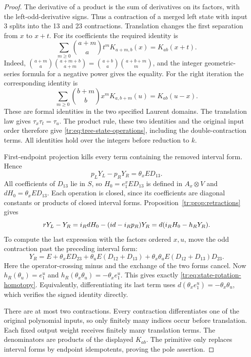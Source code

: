 \begin{proof}
The derivative of a product is the sum of derivatives on its factors,
with the left-odd-derivative signs.  Thus a contraction of a merged
left state with input 3 splits into the 13 and 23 contractions.
Translation changes the first separation from \(x\) to \(x+t\).
For its coefficients the required identity is
\[
 \sum_{m\ge0}\binom{a+m}{a}t^m K_{a+m,b}(x)
 =K_{ab}(x+t).
\]
Indeed,
\(\binom{a+m}{a}\binom{a+m+b}{a+m}
=\binom{a+b}{a}\binom{a+b+m}{m}\), and the integer
geometric-series formula for a negative power gives the equality.
For the right iteration the corresponding identity is
\[
 \sum_{m\ge0}\binom{b+m}{b}x^m K_{a,b+m}(u)
 =K_{ab}(u-x).
\]
These are formal identities in the two specified Laurent domains.
The translation law gives \(\tau_x\tau_t=\tau_u\).
The product rule, these two identities and the original input order
therefore give \eqref{tr:eq:tree-state-operations}, including the
double-contraction terms.  All identities hold over the integers
before reduction to \(k\).

First-endpoint projection kills every term containing the removed
interval form.  Hence
\[
 p_LY_L-p_RY_R=\theta_x ED_{13}.
\]
All coefficients of \(D_{13}\) lie in \(S\), so
\(H_0=e_1^x ED_{13}\) is defined in \(A_x\otimes V\)
and \(dH_0=\theta_x ED_{13}\).  Each operation is closed,
since its coefficients are diagonal constants or products of closed
interval forms.  Proposition~\ref{tr:prop:retractions} gives
\[
 rY_L-Y_R=i_RdH_0-(id-i_Rp_R)Y_R
           =d(i_RH_0-h_RY_R).
\]
To compute the last expression with the factors ordered \(x,u\),
move the odd contraction past the preceding interval form:
\[
 Y_R=E+\theta_x ED_{23}+\theta_u E(D_{12}+D_{13})
       +\theta_x\theta_u E(D_{12}+D_{13})D_{23}.
\]
Here the operator-crossing minus and the exchange of the two forms
cancel.  Now \(h_R(\theta_u)=e_1^u\) and
\(h_R(\theta_x\theta_u)=-\theta_xe_1^u\).
This gives exactly \eqref{tr:eq:state-rotation-homotopy}.
Equivalently, differentiating its last term uses
\(d(\theta_xe_1^u)=-\theta_x\theta_u\), which verifies
the signed identity directly.

There are at most two contractions.  Every contraction differentiates
one of the original polynomial inputs, so only finitely many indices
occur before translation.  Each fixed output weight receives
finitely many translation terms.  The denominators are products of
the displayed \(K_{ab}\).  The primitive only replaces interval
forms by endpoint idempotents, proving the pole assertion.
\end{proof}

